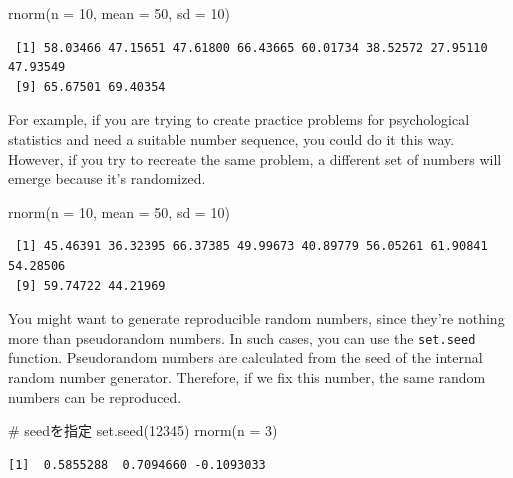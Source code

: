 \documentclass[
  a4paper,
]{book}
\newenvironment{Shaded}{\begin{snugshade}}{\end{snugshade}}
\newcommand{\AttributeTok}[1]{\textcolor[rgb]{0.40,0.45,0.13}{#1}}
\newcommand{\CommentTok}[1]{\textcolor[rgb]{0.37,0.37,0.37}{#1}}
\newcommand{\DecValTok}[1]{\textcolor[rgb]{0.68,0.00,0.00}{#1}}
\newcommand{\FunctionTok}[1]{\textcolor[rgb]{0.28,0.35,0.67}{#1}}
\newcommand{\NormalTok}[1]{\textcolor[rgb]{0.00,0.23,0.31}{#1}}
\begin{document}
\begin{Shaded}
\begin{Highlighting}[]
\FunctionTok{rnorm}\NormalTok{(}\AttributeTok{n =} \DecValTok{10}\NormalTok{, }\AttributeTok{mean =} \DecValTok{50}\NormalTok{, }\AttributeTok{sd =} \DecValTok{10}\NormalTok{)}
\end{Highlighting}
\end{Shaded}

\begin{verbatim}
 [1] 58.03466 47.15651 47.61800 66.43665 60.01734 38.52572 27.95110 47.93549
 [9] 65.67501 69.40354
\end{verbatim}

For example, if you are trying to create practice problems for
psychological statistics and need a suitable number sequence, you could
do it this way. However, if you try to recreate the same problem, a
different set of numbers will emerge because it's randomized.

\begin{Shaded}
\begin{Highlighting}[]
\FunctionTok{rnorm}\NormalTok{(}\AttributeTok{n =} \DecValTok{10}\NormalTok{, }\AttributeTok{mean =} \DecValTok{50}\NormalTok{, }\AttributeTok{sd =} \DecValTok{10}\NormalTok{)}
\end{Highlighting}
\end{Shaded}

\begin{verbatim}
 [1] 45.46391 36.32395 66.37385 49.99673 40.89779 56.05261 61.90841 54.28506
 [9] 59.74722 44.21969
\end{verbatim}

You might want to generate reproducible random numbers, since they're
nothing more than pseudorandom numbers. In such cases, you can use the
\texttt{set.seed} function. Pseudorandom numbers are calculated from the
seed of the internal random number generator. Therefore, if we fix this
number, the same random numbers can be reproduced.

\begin{Shaded}
\begin{Highlighting}[]
\CommentTok{\# seedを指定}
\FunctionTok{set.seed}\NormalTok{(}\DecValTok{12345}\NormalTok{)}
\FunctionTok{rnorm}\NormalTok{(}\AttributeTok{n =} \DecValTok{3}\NormalTok{)}
\end{Highlighting}
\end{Shaded}

\begin{verbatim}
[1]  0.5855288  0.7094660 -0.1093033
\end{verbatim}
\end{document}
